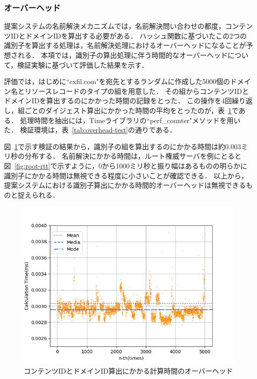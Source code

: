 \newpage
\subsubsection{オーバーヘッド}
提案システムの名前解決メカニズムでは，名前解決問い合わせの都度，コンテンツIDとドメインIDを算出する必要がある．
ハッシュ関数に基づいたこの2つの識別子を算出する処理は，名前解決処理におけるオーバーヘッドになることが予想される．
本項では，識別子の算出処理に伴う時間的なオーバーヘッドについて，検証実験に基づいて評価した結果を示す．

評価では，はじめに``exfil.com"を宛先とするランダムに作成した5000個のドメイン名とリソースレコードのタイプの組を用意した．
その組からコンテンツIDとドメインIDを算出するのにかかった時間の記録をとった．
この操作を4回繰り返し，組ごとのダイジェスト算出にかかった時間の平均をとったのが，表~\ref{fig:overhead}である．
処理時間を抽出には，Timeライブラリの``perf\_counter"メソッドを用いた．
検証環境は，表~\ref{tab:overhead-test}の通りである．



図~\ref{fig:overhead}で示す検証の結果から，識別子の組を算出するのにかかる時間は約0.003ミリ秒の分布する．
名前解決にかかる時間は，ルート権威サーバを例にとると図~\ref{fig:root-rtt}で示すように，0から1000ミリ秒と振り幅はあるものの明らかに識別子にかかる時間は無視できる程度に小さいことが確認できる．
以上から，提案システムにおける識別子算出にかかる時間的オーバーヘッドは無視できるものと捉えられる．

\begin{figure}[h]
 \centering
 \includegraphics[scale=0.8]{figure/overhead.png}
 \caption{コンテンツIDとドメインID算出にかかる計算時間のオーバーヘッド}
 \label{fig:overhead}
\end{figure}


